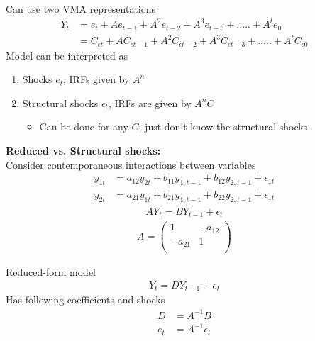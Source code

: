 \documentclass{beamer}
\begin{document}
\begin{frame}
  Can use two VMA representations
\begin{align}
  Y_t &= e_t + Ae_{t-1} + A^2e_{t-2} + A^3e_{t-3} + ..... + A^te_0\\
      &= C_{\epsilon t} +  AC_{\epsilon t-1} + A^2C_{\epsilon t-2} + A^3C_{\epsilon t-3} + ..... + A^tC_{\epsilon 0}
\end{align}
\medskip
Model can be interpreted as
\begin{enumerate}
  \item Shocks $e_t$, IRFs given by $A^n$
  \item Structural shocks $\epsilon_t$, IRFs are given by $A^nC$
  \begin{itemize}
     \item Can be done for any $C$; just don't know the structural shocks.
   \end{itemize} 
\end{enumerate}
\end{frame}

\begin{frame}
  \textbf{Reduced vs. Structural shocks:}\\
  Consider contemporaneous interactions between variables
\begin{align}
  y_{1t} &= a_{12}y_{2t} + b_{11}y_{1,t-1} + b_{12}y_{2,t-1} +\epsilon_{1t}\\ \nonumber
  y_{2t} &= a_{21}y_{1t} + b_{21}y_{1,t-1} + b_{22}y_{2,t-1} +\epsilon_{1t}
\end{align}
  \begin{align}  
    AY_t = BY_{t-1} + \epsilon_t 
  \end{align}
  \begin{align}
   A= \begin{pmatrix}
      1 & -a_{12}\\ -a_{21} & 1 \\
    \end{pmatrix}
  \end{align}
\end{frame}

\begin{frame}
  Reduced-form model
  \begin{align}
    Y_t= DY_{t-1} + e_t
  \end{align}
  \medskip
  Has following coefficients and shocks
\begin{align}
  D &= A^{-1}B \\
  e_t &= A^{-1} \epsilon_t   
\end{align}
\end{frame}
\end{document}
